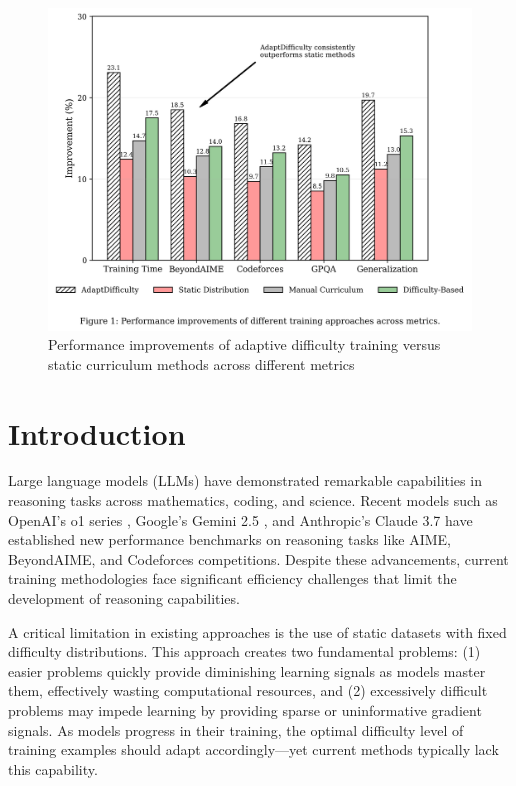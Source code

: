 \begin{figure}[H]
    \centering
    \includegraphics[width=\textwidth]{figures/performance_comparison.png}
    \caption{Performance improvements of adaptive difficulty training versus static curriculum methods across different metrics}
    \label{fig:performance-comparison}
\end{figure}


\section{Introduction}
Large language models (LLMs) have demonstrated remarkable capabilities in reasoning tasks across mathematics, coding, and science. Recent models such as OpenAI's o1 series \cite{openai2023gpt4}, Google's Gemini 2.5 \cite{google2023gemini}, and Anthropic's Claude 3.7 \cite{anthropic2023claude} have established new performance benchmarks on reasoning tasks like AIME, BeyondAIME, and Codeforces competitions. Despite these advancements, current training methodologies face significant efficiency challenges that limit the development of reasoning capabilities.

A critical limitation in existing approaches is the use of static datasets with fixed difficulty distributions. This approach creates two fundamental problems: (1) easier problems quickly provide diminishing learning signals as models master them, effectively wasting computational resources, and (2) excessively difficult problems may impede learning by providing sparse or uninformative gradient signals. As models progress in their training, the optimal difficulty level of training examples should adapt accordingly—yet current methods typically lack this capability.

